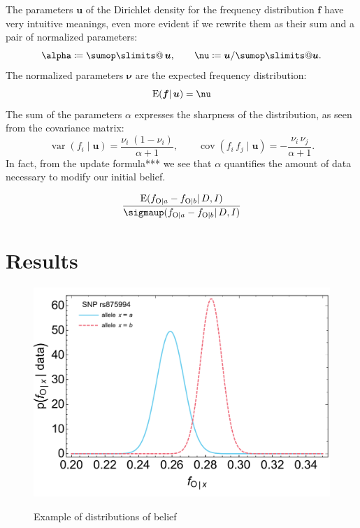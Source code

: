 \documentclass[\ifafour a4paper,12pt,\else a5paper,10pt,\fi%
onecolumn,oneside,article,%
british%
]{memoir}
\makeatletter
\theoremstyle{remark}
\theoremstyle{innote}
\def\sum{\DOTSI\sumop\slimits@}
\newcommand*{\defd}{\coloneqq}
\renewcommand*{\|}{\mathpunct{|}}
\newcommand*{\tsum}{\mathop{\textstyle\sum}\nolimits}
\newcommand*{\E}{\mathrm{E}}
\DeclarePairedDelimiter\expp{(}{)}
\newcommand*{\expe}{\E\expp}%
\DeclareMathOperator{\cov}{cov}
\DeclareMathOperator{\var}{var}
\newcommand*{\std}{\sigmaup}
\newcommand*{\yD}{D}
\newcommand*{\yI}{I}
\newcommand*{\ya}{a}
\newcommand*{\yb}{b}
\newcommand*{\ysA}{\textrm{O}}%
\newcommand*{\yA}{\alpha}
\newcommand*{\yqq}{\nu}
\newcommand*{\yq}{\bm{\yqq}}
\newcommand*{\yu}{\bm{u}}
\newcommand*{\yf}{\bm{f}}
\newcommand*{\ysum}{\tsum}
\makeatother
\begin{document}
The parameters $\yu$ of the Dirichlet density for the frequency
distribution $\yf$ have very intuitive meanings, even more evident if we
rewrite them as their sum and a pair of normalized parameters:
\begin{equation}
  \label{eq:rewrite_params}
  \yA \defd \ysum\yu,
  \qquad
  \yq\defd\yu/\sum\yu.
\end{equation}
The normalized parameters $\yq$ are the expected frequency distribution:
\begin{equation}
  \label{eq:meaning_normalized_parameters}
  \expe{\yf \| \yu} = \yq
\end{equation}
The sum of the parameters $\yA$ expresses the sharpness of the
distribution, as seen from the covariance matrix:
\begin{equation}
  \label{eq:variances_covariances}
  \var(f_i \| \yu) = \frac{\yqq_i\;(1-\yqq_i)}{\yA+1},
  \qquad
  \cov(f_i\,f_j \| \yu) = -\frac{\yqq_i\,\yqq_j}{\yA+1}.
\end{equation}
In fact, from the update formula*** we see that $\yA$ quantifies the amount
of data necessary to modify our initial belief.



\[
  \frac{  \expe{f_{\ysA\|\ya} - f_{\ysA\|\yb} \| \yD, \yI}}{
    \std(f_{\ysA\|\ya} - f_{\ysA\|\yb} \| \yD, \yI)}
\]


\section{Results}
\label{sec:results}



\begin{figure}[b!]%
 \centering\includegraphics[width=0.75\linewidth]{example_distr_condfreqs.pdf}\\
\caption{Example of distributions of belief}\label{fig:example_distributions}
\end{figure}%
\end{document}
